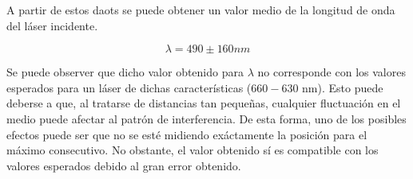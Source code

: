 \documentclass[twoside]{article}
\begin{document}
\begin{multicols}{2}
				A partir de estos daots se puede obtener un valor medio de la longitud de onda del láser incidente.

					\begin{equation}
						\lambda = 490 \pm 160 nm
					\end{equation}

				Se puede observer que dicho valor obtenido para $\lambda$ no corresponde con los valores esperados para un láser de dichas características ($660-630$ nm). Esto puede deberse a que, al tratarse de distancias tan pequeñas, cualquier fluctuación en el medio puede afectar al patrón de interferencia. De esta forma, uno de los posibles efectos puede ser que no se esté midiendo exáctamente la posición para el máximo consecutivo. No obstante, el valor obtenido sí es compatible con los valores esperados debido al gran error obtenido. 

	\end{multicols}


%
%

	    		
	    		

%	
%	
\end{document}
